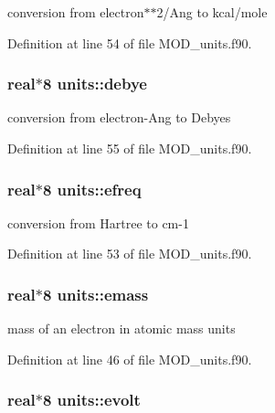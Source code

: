conversion from electron$\ast$$\ast$2/\-Ang to kcal/mole 



Definition at line 54 of file M\-O\-D\-\_\-units.\-f90.

\hypertarget{classunits_a5d28ba6adc7dbc95da97352f2b3c9216}{
\subsubsection[{debye}]{\setlength{\rightskip}{0pt plus 5cm}real$\ast$8 units\-::debye}}\label{classunits_a5d28ba6adc7dbc95da97352f2b3c9216}


conversion from electron-\/\-Ang to Debyes 



Definition at line 55 of file M\-O\-D\-\_\-units.\-f90.

\hypertarget{classunits_aa5ef6c776d66106b2e1c4e0ed775ef04}{
\subsubsection[{efreq}]{\setlength{\rightskip}{0pt plus 5cm}real$\ast$8 units\-::efreq}}\label{classunits_aa5ef6c776d66106b2e1c4e0ed775ef04}


conversion from Hartree to cm-\/1 



Definition at line 53 of file M\-O\-D\-\_\-units.\-f90.

\hypertarget{classunits_a991c951488296bc2396563916f2c5e66}{
\subsubsection[{emass}]{\setlength{\rightskip}{0pt plus 5cm}real$\ast$8 units\-::emass}}\label{classunits_a991c951488296bc2396563916f2c5e66}


mass of an electron in atomic mass units 



Definition at line 46 of file M\-O\-D\-\_\-units.\-f90.

\hypertarget{classunits_adb6bacb7ec9b35098eb6fc5976c13de7}{
\subsubsection[{evolt}]{\setlength{\rightskip}{0pt plus 5cm}real$\ast$8 units\-::evolt}}\label{classunits_adb6bacb7ec9b35098eb6fc5976c13de7}


